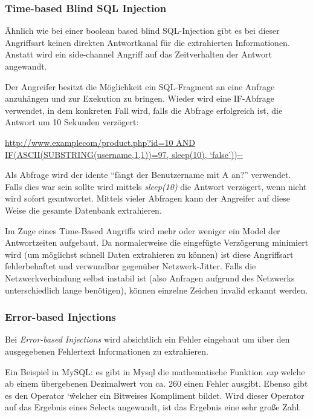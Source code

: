 \subsubsection{Time-based Blind SQL Injection}

Ähnlich wie bei einer boolean based blind SQL-Injection gibt es bei dieser Angriffsart keinen direkten Antwortkanal für die extrahierten Informationen. Anstatt wird ein side-channel Angriff auf das Zeitverhalten der Antwort angewandt.

Der Angreifer besitzt die Möglichkeit ein SQL-Fragment an eine Anfrage anzuhängen und zur Exekution zu bringen. Wieder wird eine IF-Abfrage verwendet, in dem konkreten Fall wird, falls die Abfrage erfolgreich ist, die Antwort um 10 Sekunden verzögert:

\url{http://www.examplecom/product.php?id=10 AND IF(ASCII(SUBSTRING(username,1,1))=97, sleep(10), ‘false’))--}

Als Abfrage wird der idente ``fängt der Benutzername mit A an?'' verwendet. Falls dies war sein sollte wird mittels \textit{sleep(10)} die Antwort verzögert, wenn nicht wird sofort geantwortet. Mittels vieler Abfragen kann der Angreifer auf diese Weise die gesamte Datenbank extrahieren.

Im Zuge eines Time-Based Angriffs wird mehr oder weniger ein Model der Antwortzeiten aufgebaut. Da normalerweise die eingefügte Verzögerung minimiert wird (um möglichst schnell Daten extrahieren zu können) ist diese Angriffsart fehlerbehaftet und verwundbar gegenüber Netzwerk-Jitter. Falls die Netzwerkverbindung selbst instabil ist (also Anfragen aufgrund des Netzwerks unterschiedlich lange benötigen), können einzelne Zeichen invalid erkannt werden.

\subsubsection{Error-based Injections}

Bei \textit{Error-based Injections} wird absichtlich ein Fehler eingebaut um über den ausgegebenen Fehlertext Informationen zu extrahieren.

Ein Beispiel in MySQL: es gibt in Mysql die mathematische Funktion \textit{exp} welche ab einem übergebenen Dezimalwert von ca. 260 einen Fehler ausgibt. Ebenso gibt es den Operator \char`\~ welcher ein Bitweises Kompliment bildet. Wird dieser Operator auf das Ergebnis eines Selects angewandt, ist das Ergebnis eine sehr große Zahl.

